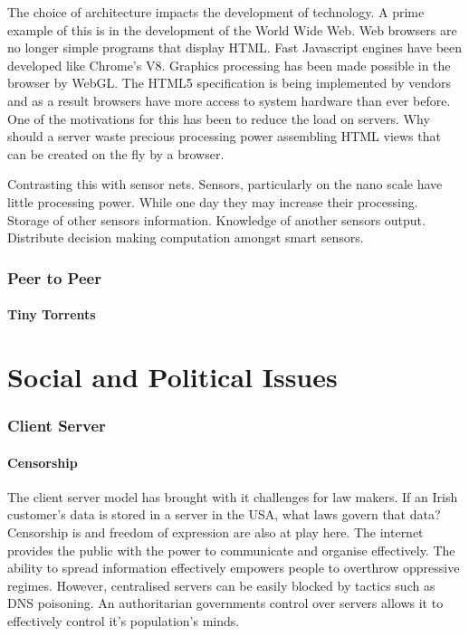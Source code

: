 \documentclass[11pt]{amsart}
\begin{document}
The choice of architecture impacts the development of technology. A prime example of this is in the development of the World Wide Web. Web browsers are no longer simple programs that display HTML. Fast Javascript engines have been developed like Chrome's V8. Graphics processing has been made possible in the browser by WebGL. The HTML5 specification is being implemented by vendors and as a result browsers have more access to system hardware than ever before. One of the motivations for this has been to reduce the load on servers. Why should a server waste precious processing power assembling HTML views that can be created on the fly by a browser.

Contrasting this with sensor nets. Sensors, particularly on the nano scale have little processing power. While one day they may increase their processing. Storage of other sensors information.
Knowledge of another sensors output.
Distribute decision making computation amongst smart sensors.

\section{Peer to Peer}
\subsection{Tiny Torrents}


\part{Social and Political Issues}
\section{Client Server}
\subsection{Censorship}
The client server model has brought with it challenges for law makers. If an Irish customer's data is stored in a server in the USA, what laws govern that data?
Censorship is and freedom of expression are also at play here. The internet provides the public with the power to communicate and organise effectively. The ability to spread information effectively empowers people to overthrow oppressive regimes. However, centralised servers can be easily blocked by tactics such as DNS poisoning. An authoritarian governments control over servers allows it to effectively control it's population's minds.
\end{document}
